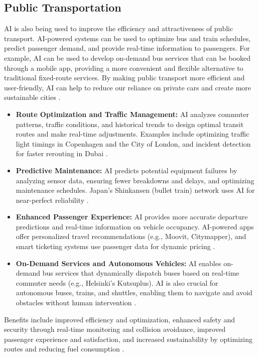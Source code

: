 \subsection{Public Transportation}
AI is also being used to improve the efficiency and attractiveness of public transport. AI-powered systems can be used to optimize bus and train schedules, predict passenger demand, and provide real-time information to passengers. For example, AI can be used to develop on-demand bus services that can be booked through a mobile app, providing a more convenient and flexible alternative to traditional fixed-route services. By making public transport more efficient and user-friendly, AI can help to reduce our reliance on private cars and create more sustainable cities \cite{isalkar2024artificial}.
\begin{itemize}
    \item \textbf{Route Optimization and Traffic Management:} AI analyzes commuter patterns, traffic conditions, and historical trends to design optimal transit routes and make real-time adjustments. Examples include optimizing traffic light timings in Copenhagen and the City of London, and incident detection for faster rerouting in Dubai \cite{Medium_PublicTransport, Praxie_PublicTransport}.
    \item \textbf{Predictive Maintenance:} AI predicts potential equipment failures by analyzing sensor data, ensuring fewer breakdowns and delays, and optimizing maintenance schedules. Japan's Shinkansen (bullet train) network uses AI for near-perfect reliability \cite{NewO_PublicTransport, Urban_PublicTransport}.
    \item \textbf{Enhanced Passenger Experience:} AI provides more accurate departure predictions and real-time information on vehicle occupancy. AI-powered apps offer personalized travel recommendations (e.g., Moovit, Citymapper), and smart ticketing systems use passenger data for dynamic pricing \cite{InitSE_PublicTransport, AppInventiv_PublicTransport}.
    \item \textbf{On-Demand Services and Autonomous Vehicles:} AI enables on-demand bus services that dynamically dispatch buses based on real-time commuter needs (e.g., Helsinki's Kutsuplus). AI is also crucial for autonomous buses, trains, and shuttles, enabling them to navigate and avoid obstacles without human intervention \cite{UITP_PublicTransport}.
\end{itemize}
Benefits include improved efficiency and optimization, enhanced safety and security through real-time monitoring and collision avoidance, improved passenger experience and satisfaction, and increased sustainability by optimizing routes and reducing fuel consumption \cite{NewO_PublicTransport, Praxie_PublicTransport}.

